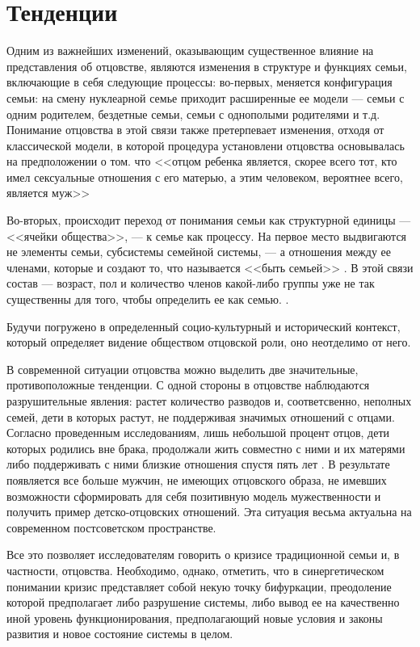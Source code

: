 \documentclass{../../common/thesisbyxetex}
\begin{document}
\section{Тенденции}

Одним из важнейших изменений, оказывающим существенное влияние на представления об отцовстве,
являются
изменения в структуре и функциях семьи,  включающие в себя следующие процессы:
во-первых, меняется конфигурация семьи: на смену нуклеарной семье приходит расширенные
ее модели --- семьи с одним родителем, бездетные семьи, семьи с однополыми родителями и т.д.
Понимание отцовства
в этой связи также претерпевает изменения, отходя от классической модели, в которой процедура
установлени отцовства основывалась на предположении о том. что <<отцом ребенка является, скорее
всего
 тот, кто имел сексуальные отношения с его матерью, а этим человеком, вероятнее всего,
является муж>> \cite[318]{legfat}

Во-вторых, происходит переход от понимания семьи как структурной единицы --- <<ячейки общества>>,
--- к семье как процессу. На первое место выдвигаются не элементы семьи, субсистемы семейной
системы, --- а отношения между ее членами, которые и создают то, что называется <<быть семьей>>
\cite{fam}. В этой связи состав  --- возраст, пол и количество  членов какой-либо группы уже не так
существенны для того, чтобы определить  ее как семью. \cite[15]{fatpsy}.

Будучи погружено в определенный социо-культурный и исторический контекст, который определяет
видение обществом
отцовской роли, оно неотделимо от него.

В современной ситуации отцовства можно выделить две значительные, противоположные
тенденции. С одной стороны  в отцовстве наблюдаются разрушительные явления: растет количество
разводов и, соответсвенно, неполных семей, дети в которых растут, не поддерживая значимых отношений
с отцами. Согласно проведенным исследованиям, лишь небольшой процент отцов, дети которых
родились вне брака, продолжали жить совместно с ними и их матерями либо поддерживать с ними близкие
отношения спустя пять лет \cite{long}. В результате появляется все больше мужчин, не имеющих
отцовского образа, не имевших возможности сформировать для себя позитивную модель мужественности и
получить пример детско-отцовских отношений. Эта ситуация весьма актуальна на современном
постсоветском пространстве.

Все это позволяет исследователям говорить о кризисе традиционной семьи и, в частности, отцовства.
Необходимо, однако, отметить, что в синергетическом понимании кризис представляет собой некую точку
бифуркации, преодоление которой предполагает либо разрушение системы, либо вывод ее на качественно
иной уровень функционирования, предполагающий новые условия и законы развития и новое состояние
системы в целом.
\end{document}
